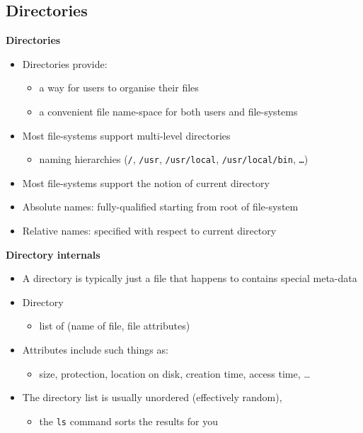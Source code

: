 \documentclass[11pt,a4paper]{article}
\begin{document}
\subsection{Directories}

\textbf{Directories}
\begin{itemize}
    \item Directories provide:
        \begin{itemize}
            \item a way for users to organise their files
            \item a convenient file name-space for both users and file-systems
        \end{itemize}
    \item Most file-systems support multi-level directories
        \begin{itemize}
            \item naming hierarchies (\texttt{/}, \texttt{/usr}, \texttt{/usr/local},
                \texttt{/usr/local/bin}, \texttt{\dots})
        \end{itemize}
    \item Most file-systems support the notion of current directory
    \item Absolute names: fully-qualified starting from root of file-system
    \item Relative names: specified with respect to current directory
\end{itemize}

\textbf{Directory internals}
\begin{itemize}
    \item A directory is typically just a file that happens to contains special meta-data
    \item Directory
        \begin{itemize}
            \item list of (name of file, file attributes)
        \end{itemize}
    \item Attributes include such things as:
        \begin{itemize}
            \item size, protection, location on disk, creation time, access time, \dots
        \end{itemize}
    \item The directory list is usually unordered (effectively random),
        \begin{itemize}
            \item the \texttt{ls} command sorts the results for you
        \end{itemize}
\end{itemize}
\end{document}
